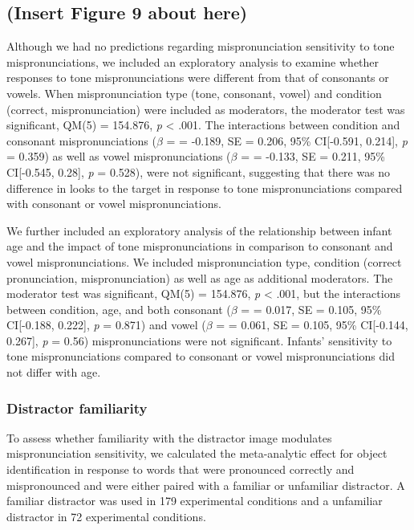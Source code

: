 \documentclass[man]{apa6}
\begin{document}
\hypertarget{insert-figure-9-about-here}{%
\subsection{(Insert Figure 9 about here)}\label{insert-figure-9-about-here}}

Although we had no predictions regarding mispronunciation sensitivity to tone mispronunciations, we included an exploratory analysis to examine whether responses to tone mispronunciations were different from that of consonants or vowels. When mispronunciation type (tone, consonant, vowel) and condition (correct, mispronunciation) were included as moderators, the moderator test was significant, QM(5) = 154.876, \emph{p} \textless{} .001. The interactions between condition and consonant mispronunciations (\(\beta\) = = -0.189, SE = 0.206, 95\% CI{[}-0.591, 0.214{]}, \emph{p} = 0.359) as well as vowel mispronunciations (\(\beta\) = = -0.133, SE = 0.211, 95\% CI{[}-0.545, 0.28{]}, \emph{p} = 0.528), were not significant, suggesting that there was no difference in looks to the target in response to tone mispronunciations compared with consonant or vowel mispronunciations.

We further included an exploratory analysis of the relationship between infant age and the impact of tone mispronunciations in comparison to consonant and vowel mispronunciations. We included mispronunciation type, condition (correct pronunciation, mispronunciation) as well as age as additional moderators. The moderator test was significant, QM(5) = 154.876, \emph{p} \textless{} .001, but the interactions between condition, age, and both consonant (\(\beta\) = = 0.017, SE = 0.105, 95\% CI{[}-0.188, 0.222{]}, \emph{p} = 0.871) and vowel (\(\beta\) = = 0.061, SE = 0.105, 95\% CI{[}-0.144, 0.267{]}, \emph{p} = 0.56) mispronunciations were not significant. Infants' sensitivity to tone mispronunciations compared to consonant or vowel mispronunciations did not differ with age.

\hypertarget{distractor-familiarity}{%
\subsubsection{Distractor familiarity}\label{distractor-familiarity}}

To assess whether familiarity with the distractor image modulates mispronunciation sensitivity, we calculated the meta-analytic effect for object identification in response to words that were pronounced correctly and mispronounced and were either paired with a familiar or unfamiliar distractor. A familiar distractor was used in 179 experimental conditions and a unfamiliar distractor in 72 experimental conditions.
\end{document}
